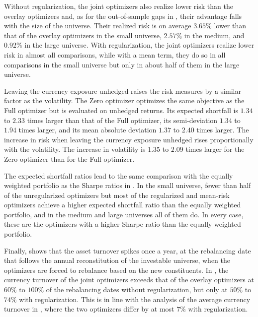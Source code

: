 Without regularization, the joint optimizers also realize lower risk than the overlay optimizers and, as for the
out-of-sample gaps in , their advantage falls with the size of the universe. Their
realized risk is on average $3.65\%$ lower than that of the overlay optimizers in the small universe, $2.57\%$ in the
medium, and $0.92\%$ in the large universe. With regularization, the joint optimizers realize lower risk in almost all
comparisons, while with a mean term, they do so in all comparisons in the small universe but only in about half of them
in the large universe.

Leaving the currency exposure unhedged raises the risk measures by a similar factor as the volatility. The Zero
optimizer optimizes the same objective as the Full optimizer but is evaluated on unhedged returns. Its expected
shortfall is $1.34$ to $2.33$ times larger than that of the Full optimizer, its semi-deviation $1.34$ to $1.94$ times larger, and its mean
absolute deviation $1.37$ to $2.40$ times larger. The increase in risk when leaving the currency exposure unhedged rises proportionally with the 
volatility. The increase in volatility is $1.35$ to $2.09$ times larger for the Zero optimizer than for the Full optimizer. 

The expected shortfall ratios lead to the same comparison with the equally weighted portfolio as the Sharpe ratios in
. In the small universe, fewer than half of the unregularized optimizers but most of the
regularized and mean-risk optimizers achieve a higher expected shortfall ratio than the equally weighted portfolio, and
in the medium and large universes all of them do. In every case, these are the optimizers with a higher Sharpe ratio
than the equally weighted portfolio.


Finally,  shows that the asset turnover spikes once a year, at the rebalancing date that
follows the annual reconstitution of the investable universe, when the optimizers are forced to rebalance based on the new constituents. 
In ,
the currency turnover of the joint optimizers exceeds that of the overlay optimizers at $60\%$ to $100\%$ of the
rebalancing dates without regularization, but only at $50\%$ to $74\%$ with regularization. This is in line with the analysis of the average
currency turnover in , where the two optimizers differ by at most $7\%$ with regularization.

